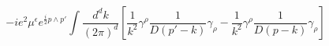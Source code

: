 \begin{equation}
-ie^{2}\mu^{\epsilon}e^{\frac{i}{2}p\wedge
p'}\int\frac{d^{d}k}{(2\pi)^{d}} \left[
\frac{1}{k^{2}}\gamma^{\rho}\frac{1}{D(p'-k)}\gamma_{\rho}
-\frac{1}{k^{2}}\gamma^{\rho}\frac{1}{D(p-k)}\gamma_{\rho} \right]
\end{equation}

